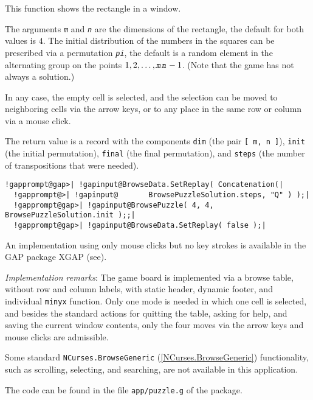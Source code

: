 \documentclass[a4paper,11pt]{report}
\begin{document}
{{{ This function shows the rectangle in a window. 

 The arguments \mbox{\texttt{\mdseries\slshape m}} and \mbox{\texttt{\mdseries\slshape n}} are the dimensions of the rectangle, the default for both values is $4$. The initial distribution of the numbers in the squares can be prescribed via
a permutation \mbox{\texttt{\mdseries\slshape pi}}, the default is a random element in the alternating group on the points $1, 2, \ldots, \mbox{\texttt{\mdseries\slshape m}} \mbox{\texttt{\mdseries\slshape n}} - 1$. (Note that the game has not always a solution.) 

 In any case, the empty cell is selected, and the selection can be moved to
neighboring cells via the arrow keys, or to any place in the same row or
column via a mouse click. 

 The return value is a record with the components \texttt{dim} (the pair \texttt{[ m, n ]}), \texttt{init} (the initial permutation), \texttt{final} (the final permutation), and \texttt{steps} (the number of transpositions that were needed). 
\begin{Verbatim}[commandchars=!@|,fontsize=\small,frame=single,label=Example]
  !gapprompt@gap>| !gapinput@BrowseData.SetReplay( Concatenation(|
  !gapprompt@>| !gapinput@       BrowsePuzzleSolution.steps, "Q" ) );|
  !gapprompt@gap>| !gapinput@BrowsePuzzle( 4, 4, BrowsePuzzleSolution.init );;|
  !gapprompt@gap>| !gapinput@BrowseData.SetReplay( false );|
\end{Verbatim}
 An implementation using only mouse clicks but no key strokes is available in
the \textsf{GAP} package \textsf{XGAP} (see{\nobreakspace}\cite{XGAP}). 

 \emph{Implementation remarks}: The game board is implemented via a browse table, without row and column
labels, with static header, dynamic footer, and individual \texttt{minyx} function. Only one mode is needed in which one cell is selected, and besides
the standard actions for quitting the table, asking for help, and saving the
current window contents, only the four moves via the arrow keys and mouse
clicks are admissible.  

 Some standard \texttt{NCurses.BrowseGeneric} (\ref{NCurses.BrowseGeneric}) functionality, such as scrolling, selecting, and searching, are not available
in this application. 

 The code can be found in the file \texttt{app/puzzle.g} of the package. }

 }

}
\end{document}
